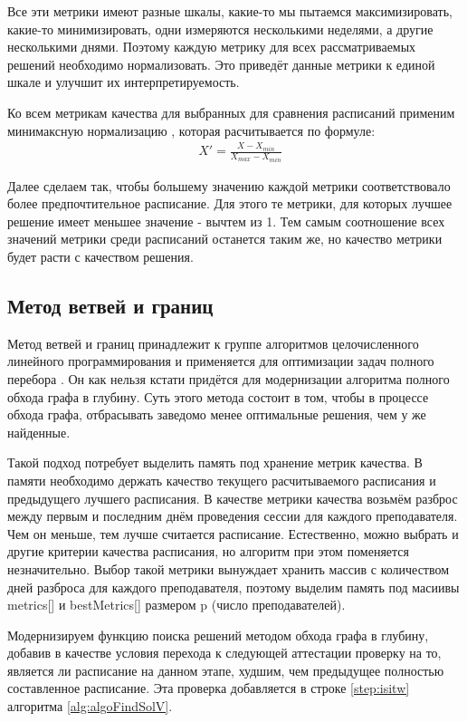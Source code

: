 Все эти метрики имеют разные шкалы, какие-то мы пытаемся максимизировать, какие-то минимизировать, одни измеряются несколькими неделями, а другие несколькими днями. Поэтому каждую метрику для всех рассматриваемых решений необходимо нормализовать. Это приведёт данные метрики к единой шкале и улучшит их интерпретируемость.

Ко всем метрикам качества для выбранных для сравнения расписаний применим минимаксную нормализацию \cite{minimax}, которая расчитывается по формуле:
\begin{align}
	& X' =  \frac{X-X_{min}}{X_{max}-X_{min}}
\end{align}

Далее сделаем так, чтобы большему значению каждой метрики соответствовало более предпочтительное расписание. Для этого те метрики, для которых лучшее решение имеет меньшее значение - вычтем из 1. Тем самым соотношение всех значений метрики среди расписаний останется таким же, но качество метрики будет расти с качеством решения. 

\subsection{Метод ветвей и границ}
Метод ветвей и границ принадлежит к группе алгоритмов целочисленного линейного программирования и применяется для оптимизации задач полного перебора \cite{branch}. Он как нельзя кстати придётся для модернизации алгоритма полного обхода графа в глубину.
Суть этого метода состоит в том, чтобы в процессе обхода графа, отбрасывать заведомо менее оптимальные решения, чем у же найденные.

Такой подход потребует выделить память под хранение метрик качества. В памяти необходимо держать качество текущего расчитываемого расписания и предыдущего лучшего расписания.
В качестве метрики качества возьмём разброс между первым и последним днём проведения сессии для каждого преподавателя. Чем он меньше, тем лучше считается расписание. Естественно, можно выбрать и другие критерии качества расписания, но алгоритм при этом поменяется незначительно.
Выбор такой метрики вынуждает хранить массив с количеством дней разброса для каждого преподавателя, поэтому выделим память под масиивы metrics[] и bestMetrics[] размером p (число преподавателей).

Модернизируем функцию поиска решений методом обхода графа в глубину, 
добавив в качестве условия перехода к следующей аттестации проверку на то, является ли расписание на данном этапе, худшим, чем предыдущее полностью составленное расписание. Эта проверка добавляется в строке \ref{step:isitw} алгоритма \ref{alg:algoFindSolV}.

